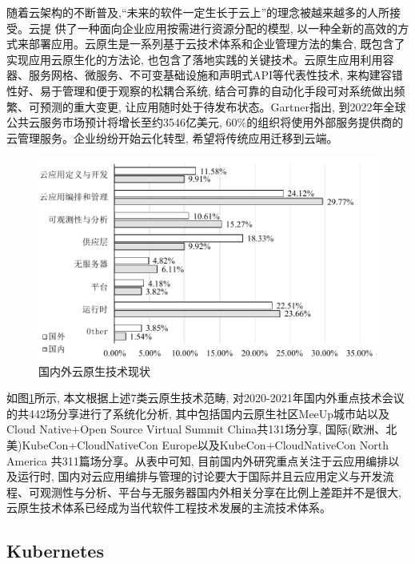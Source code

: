 随着云架构的不断普及,“未来的软件一定生长于云上”的理念被越来越多的人所接受。云提
供了一种面向企业应用按需进行资源分配的模型, 以一种全新的高效的方式来部署应用。云原生是一系列基于云技术体系和企业管理方法的集合, 既包含了实现应用云原生化的方法论, 也包含了落地实践的关键技术。云原生应用利用容器、服务网格、微服务、不可变基础设施和声明式API等代表性技术, 来构建容错性好、易于管理和便于观察的松耦合系统, 结合可靠的自动化手段可对系统做出频繁、可预测的重大变更, 让应用随时处于待发布状态。Gartner指出, 到2022年全球公共云服务市场预计将增长至约3546亿美元, 60\%的组织将使用外部服务提供商的云管理服务\cite{bhagavan2020achieving}。企业纷纷开始云化转型, 希望将传统应用迁移到云端。

\begin{figure}[h] %
    \centering %
    \includegraphics[width=0.9 \textwidth]{FIGs/chapter2/workshop.pdf} %
    \caption{国内外云原生技术现状} %
    \label{workshop} %
\end{figure}%

如图\ref{workshop}所示, 本文根据上述7类云原生技术范畴, 对2020-2021年国内外重点技术会议的共442场分享进行了系统化分析, 其中包括国内云原生社区MeeUp城市站以及Cloud Native+Open Source Virtual Summit China共131场分享, 国际(欧洲、北美)KubeCon+CloudNativeCon Europe以及KubeCon+CloudNativeCon North America 共311篇场分享。从表中可知, 目前国内外研究重点关注于云应用编排以及运行时, 国内对云应用编排与管理的讨论要大于国际并且云应用定义与开发流程、可观测性与分析、平台与无服务器国内外相关分享在比例上差距并不是很大, 云原生技术体系已经成为当代软件工程技术发展的主流技术体系。

\subsection{Kubernetes}

